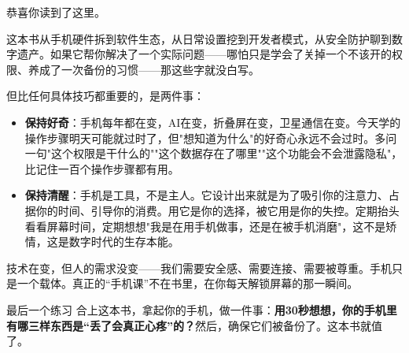 
恭喜你读到了这里。

这本书从手机硬件拆到软件生态，从日常设置挖到开发者模式，从安全防护聊到数字遗产。如果它帮你解决了一个实际问题——哪怕只是学会了关掉一个不该开的权限、养成了一次备份的习惯——那这些字就没白写。

但比任何具体技巧都重要的，是两件事：

\begin{itemize}
  \item \textbf{保持好奇}：手机每年都在变，AI在变，折叠屏在变，卫星通信在变。今天学的操作步骤明天可能就过时了，但"想知道为什么"的好奇心永远不会过时。多问一句"这个权限是干什么的""这个数据存在了哪里""这个功能会不会泄露隐私"，比记住一百个操作步骤都有用。
  \item \textbf{保持清醒}：手机是工具，不是主人。它设计出来就是为了吸引你的注意力、占据你的时间、引导你的消费。用它是你的选择，被它用是你的失控。定期抬头看看屏幕时间，定期想想"我是在用手机做事，还是在被手机消磨"，这不是矫情，这是数字时代的生存本能。
\end{itemize}

技术在变，但人的需求没变——我们需要安全感、需要连接、需要被尊重。手机只是一个载体。真正的“手机课”不在书里，在你每天解锁屏幕的那一瞬间。

\begin{tcbpractice}{最后一个练习}
合上这本书，拿起你的手机，做一件事：\textbf{用30秒想想，你的手机里有哪三样东西是“丢了会真正心疼”的？}然后，确保它们被备份了。这本书就值了。

\end{tcbpractice}
